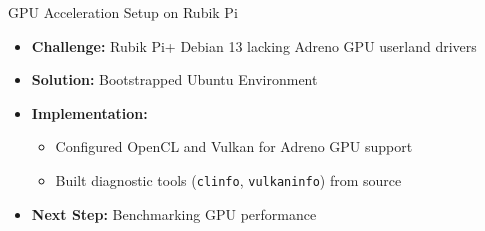 \begin{frame}{GPU Acceleration Setup on Rubik Pi}
   \begin{itemize}
       \item \textbf{Challenge:} Rubik Pi+ Debian 13 lacking Adreno GPU userland drivers
       \item \textbf{Solution:} Bootstrapped Ubuntu Environment
       \item \textbf{Implementation:}
           \begin{itemize}
               \item Configured OpenCL and Vulkan for Adreno GPU support
               \item Built diagnostic tools (\texttt{clinfo}, \texttt{vulkaninfo}) from source
           \end{itemize}
       \item \textbf{Next Step:} Benchmarking GPU performance
   \end{itemize}
\end{frame}

